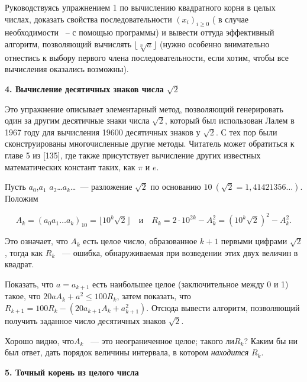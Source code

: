 Руководствуясь упражнением 1 по вычислению квадратного корня в целых числах, доказать свойства последовательности $\left({x_{i}}\right)_{i\geqslant{0}}$ ( в случае необходимости ~-- с помощью программы) и вывести оттуда эффективный алгоритм, позволяющий вычислять $\lfloor\sqrt[n]{a}\rfloor$ (нужно особенно внимательно отнестись к выбору первого члена последовательности, если хотим, чтобы все вычисления оказались возможны). 

\noindent\textbf{4. Вычисление десятичных знаков числа $\sqrt{2}$}\ \newline

Это упражнение описывает элементарный метод, позволяющий генерировать один за другим десятичные знаки числа $\sqrt{2}$, который был использован Лалем в 1967 году для вычисления 19600 десятичных знаков у $\sqrt{2}$. С тех пор были сконструированы многочисленные другие методы. Читатель может обратиться к главе 5 из [135], где также присутствует вычисление других известных математических констант таких, как ${\pi}$ и ${e}$.

Пусть $ a_{0}$,$a_{1}$ $a_{2}$\dots $a_{k}$\dots ~--- разложение $\sqrt{2}$ по основанию $10~(\sqrt{2}=1,41421356 \dots)$. Положим 

\begin{equation*}
A_{k}=\left(a_{0}a_{1}\ldots a_{k}\right)_{10}=\lfloor{10^{k}\sqrt{2}}\rfloor \quad\text{и}\quad R_{k}=2\cdot10^{2k}-A_k^2=\left({10^{k}\sqrt{2}}\right)^{2}-A_k^2.
\end{equation*}

\newpage
	

\noindent Это означает, что $A_{k}$ есть целое число, образованное $k+1$ первыми цифрами $\sqrt{2}$, тогда как $R_{k}$ ~--- ошибка, обнаруживаемая при возведении этих двух величин в квадрат.

Показать, что $a=a_{k+1}$ есть наибольшее целое (заключительное между 0 и 1) такое, что $20aA_{k}+a^{2}\leq{100R_{k}}$, затем показать, что $R_{k+1}=100R_{k} - \left({20a_{k+1}A_{k}+ a_{k+1}^2}\right)$. Отсюда вывести алгоритм, позволяющий получить заданное число десятичных знаков $\sqrt{2}$. 

Хорошо видно, что$ A_{k}$ ~--- это неограниченное целое; такого ли$ R_{k}$?
Каким бы ни был ответ, дать порядок величины интервала, в котором \textit{находится} $R_{k}$.

\noindent\textbf{5. Точный корень из целого числа}\ \newline

